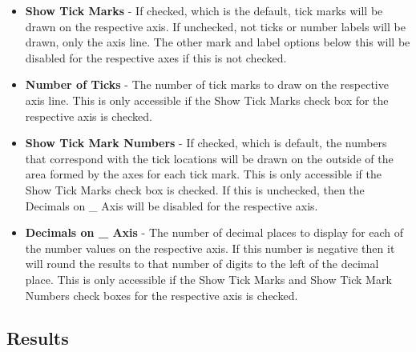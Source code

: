 \documentclass[titlepage,12pt]{article}
\begin{document}
\begin{itemize}
\begin{itemize}
\item \textbf{Show Tick Marks} - If checked, which is the default, tick marks will be drawn on the respective axis. If unchecked, not ticks or number labels will be drawn, only the axis line. The other mark and label options below this will be disabled for the respective axes if this is not checked.
\item \textbf{Number of Ticks} - The number of tick marks to draw on the respective axis line. This is only accessible if the Show Tick Marks check box for the respective axis is checked.
\item \textbf{Show Tick Mark Numbers} - If checked, which is default, the numbers that correspond with the tick locations will be drawn on the outside of the area formed by the axes for each tick mark. This is only accessible if the Show Tick Marks check box is checked. If this is unchecked, then the Decimals on \_ Axis will be disabled for the respective axis.
\item \textbf{Decimals on \_ Axis} - The number of decimal places to display for each of the number values on the respective axis. If this number is negative then it will round the results to that number of digits to the left of the decimal place. This is only accessible if the Show Tick Marks and Show Tick Mark Numbers check boxes for the respective axis is checked.
\end{itemize}

\end{itemize}



\subsection{Results}
\label{subsec:results}
\end{document}
